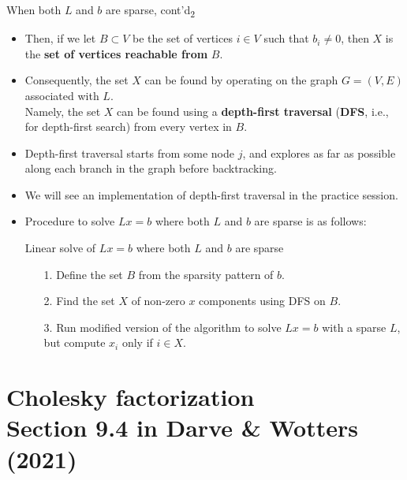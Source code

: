 \documentclass[t,usepdftitle=false]{beamer}
\begin{document}
\begin{frame}{When both $L$ and $b$ are sparse, cont'd\textsubscript{2}}
\begin{itemize}
\item Then, if we let $B\subset V$ be the set of vertices $i\in V$ such that $b_i\neq 0$, then $X$ is the \textbf{set of vertices reachable from} $B$. 
\item Consequently, the set $X$ can be found by operating on the graph $\!G\!=\!(V,E)\!\!\!$ associated with $L$.\vspace{.1cm}\\
Namely, the set $X$ can be found using a \textbf{depth-first traversal} (\textbf{DFS}, i.e., for depth-first search) from every vertex in $B$.
\item Depth-first traversal starts from some node $j$, and explores as far as possible along each branch in the graph before backtracking.
\item We will see an implementation of depth-first traversal in the practice session.
\item Procedure to solve $Lx=b$ where both $L$ and $b$ are sparse is as follows:
\begin{block}{Linear solve of $Lx=b$ where both $L$ and $b$ are sparse}
\begin{itemize}
\item[1.] Define the set $B$ from the sparsity pattern of $b$.\vspace{-.1cm}
\item[2.] Find the set $X$ of non-zero $x$ components using DFS on $B$.\vspace{-.1cm}
\item[3.] Run modified version of the algorithm to solve $Lx=b$ with a sparse $L$, but compute $x_i$ only if $i\in X$.
\end{itemize}
\end{block}
\end{itemize}
\end{frame}

\section{Cholesky factorization\\{\small Section 9.4 in Darve \& Wotters (2021)}}
\end{document}
